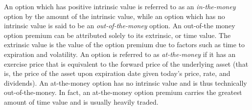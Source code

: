 \documentclass[12pt, a4paper, notitlepage]{article}
\numberwithin{equation}{subsection}
\numberwithin{figure}{subsection}
\numberwithin{table}{subsection}
\newcommand{\newpar}{\newline \newline}
\begin{document}
An option which has positive intrinsic value is referred to as an \textit{in-the-money} option by the amount of the intrinsic value, while an option which has no intrinsic value is said to be an \textit{out-of-the-money} option.  An out-of-the money option premium can be attributed solely to its extrinsic, or time value.  The extrinsic value is the value of the option premium due to factors such as time to expiration and volatility.
\newpar
An option is referred to as \textit{at-the-money} if it has an exercise price that is equivalent to the forward price of the underlying asset (that is, the price of the asset upon expiration date given today's price, rate, and dividends).  An at-the-money option has no intrinsic value and is thus technically out-of-the-money.  In fact, an at-the-money option premium carries the greatest amount of time value and is usually heavily traded.
\end{document}
